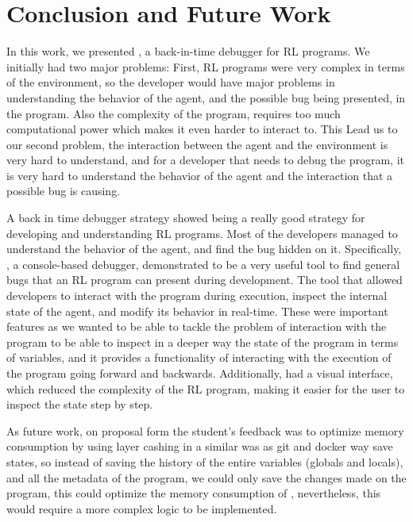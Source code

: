 
\section{Conclusion and Future Work}
\label{sec:conclusion}

In this work, we presented \flik, a back-in-time debugger for \ac{RL} programs.
We initially had two major problems: First, \ac{RL} programs were very complex in terms of the environment,
so the developer would have major problems in understanding the behavior of the agent, and
the possible bug being presented, in the program. Also the complexity of the program, requires
too much computational power which makes it even harder to interact to. This Lead us to our second problem,
the interaction between the agent and the environment is very hard to understand, and
for a developer that needs to debug the program, it is very hard to understand the behavior of the agent
and the interaction that a possible bug is causing.

A back in time debugger strategy showed being a really good strategy for developing and 
understanding RL programs. Most of the developers managed to understand the behavior of the agent,
and find the bug hidden on it. Specifically, \flik, a console-based debugger, demonstrated to 
be a very useful tool to find general bugs that an \ac{RL} program can present during development. 
The tool that allowed developers to interact with the program during 
execution, inspect the internal state of the agent, and modify its behavior in real-time. These were 
important features as we wanted \flik to be able to tackle the problem of interaction with the 
program to be able to inspect in a deeper way the state of the program in terms of variables, and 
it provides a functionality of interacting with the execution of the program going forward and backwards.
Additionally, \flik had a visual interface, which reduced the complexity of the \ac{RL} program,
making it easier for the user to inspect the state step by step.


As future work, on proposal form the student's feedback was to optimize memory consumption by 
using layer cashing in a similar was as git and docker way save states, so instead of saving the
history of the entire variables (globals and locals), and all the metadata of the program, we could 
only save the changes made on the program, this could optimize the memory consumption of \flik,
nevertheless, this would require a more complex logic to be implemented. 

